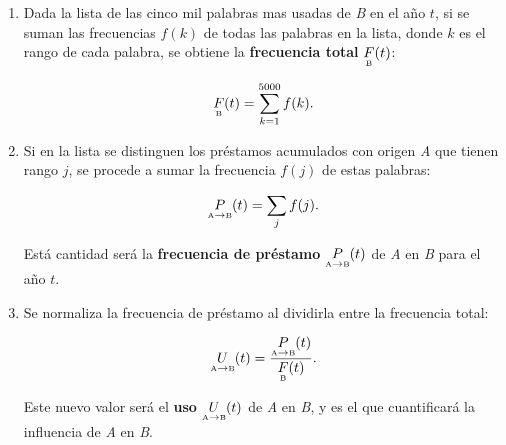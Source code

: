 \begin{enumerate}
	\label{proceso_uso}
	
	\item  Dada la lista de las cinco mil palabras mas usadas de \textit{B} en el año $t$, si se suman las frecuencias $f(k)$ de 
	todas las palabras en la lista, donde $k$ es el rango  de cada palabra, se obtiene la \textbf{frecuencia total} $\underset{\text{\tiny B}}{F}(t)$:
	
	\begin{equation}
	\label{ec.ftot}
	\underset{\text{\tiny B}}{F}(t) = \sum_{k=1}^{5000} f(k).
	\end{equation}
	 
	
	\item Si en la lista se distinguen los préstamos acumulados con origen \textit{A}  que tienen rango $j$,  se procede a sumar la frecuencia $f(j)$ de estas palabras:
	
	\begin{equation}
	\label{ec.fpres}
	\underset{ \text{\tiny A} \to  \text{\tiny B} }{P}(t) = \sum_{j} f(j).
	\end{equation}
	
	Está cantidad será la  \textbf{frecuencia de préstamo} $\underset{ \text{\tiny A} \to  \text{\tiny B} }{P}(t)$   de \textit{A} en \textit{B} para el año $t$.
	
	\item Se normaliza la frecuencia de préstamo al dividirla entre la frecuencia total:
	
	
	\begin{equation}
	\label{ec.fuso}
	\underset{ \text{\tiny A} \to  \text{\tiny B} }{U}(t) = \frac{	\underset{ \text{\tiny A} \to  \text{\tiny B} }{P}(t)}{\underset{\text{\tiny B}}{F}(t) }.
	\end{equation}	
	
	Este nuevo valor será el \textbf{uso} $\underset{ \text{\tiny A} \to  \text{\tiny B} }{U}(t)$  de \textit{A} en \textit{B}, y es el que cuantificará la influencia de \textit{A} en \textit{B}. 
	
	
\end{enumerate}

